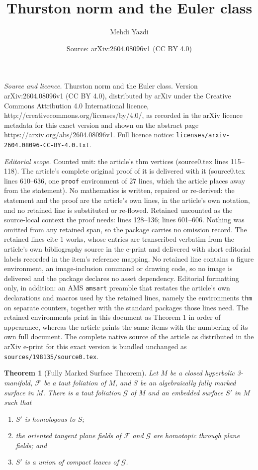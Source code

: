 \documentclass[10pt,a4paper]{amsart}
\title{Thurston norm and the Euler class}
\author{Mehdi Yazdi}
\date{Source: arXiv:2604.08096v1 (CC BY 4.0)}
\newtheorem{thm}{Theorem}
\begin{document}
\maketitle

\noindent\emph{Source and licence.} Thurston norm and the Euler class. Version arXiv:2604.08096v1 (CC BY 4.0), distributed by arXiv under the Creative Commons Attribution 4.0 International licence, http://creativecommons.org/licenses/by/4.0/, as recorded in the arXiv licence metadata for this exact version and shown on the abstract page https://arxiv.org/abs/2604.08096v1. Full licence notice: \texttt{licenses/arxiv-2604.08096-CC-BY-4.0.txt}.\par\smallskip

\noindent\textit{Editorial scope.} Counted unit: the article's thm vertices (source0.tex lines 115--118). The article's complete original proof of it is delivered with it (source0.tex lines 610--636, one \texttt{proof} environment of 27 lines, which the article places away from the statement). No mathematics is written, repaired or re-derived: the statement and the proof are the article's own lines, in the article's own notation, and no retained line is substituted or re-flowed.  Retained uncounted as the source-local context the proof needs: lines 128--136; lines 601--606.  Nothing was omitted from any retained span, so the package carries no omission record.  The retained lines cite 1 works, whose entries are transcribed verbatim from the article's own bibliography source in the e-print and delivered with short editorial labels recorded in the item's reference mapping.  No retained line contains a figure environment, an image-inclusion command or drawing code, so no image is delivered and the package declares no asset dependency.  Editorial formatting only, in addition: an AMS \texttt{amsart} preamble that restates the article's own declarations and macros used by the retained lines, namely the environments \texttt{thm} on separate counters, together with the standard packages those lines need.  The retained environments print in this document as Theorem 1 in order of appearance, whereas the article prints the same items with the numbering of its own full document.  The complete native source of the article as distributed in the arXiv e-print for this exact version is bundled unchanged as \texttt{sources/198135/source0.tex}.
	 \begin{thm}[Fully Marked Surface Theorem]
	 	Let $M$ be a closed hyperbolic 3-manifold, $\mathcal{F}$ be a taut foliation of $M$, and $S$ be an algebraically fully marked surface in $M$. There is a taut foliation $\mathcal{G}$ of $M$ and an embedded surface $S'$ in $M$ such that 
	 	\begin{enumerate}
	 		\item $S'$ is homologous to $S$; 
	 		\item the oriented tangent plane fields of $\mathcal{F}$ and $\mathcal{G}$ are homotopic through plane fields; and 
	 		\item $S'$ is a  union of compact leaves of $\mathcal{G}$.
	 	\end{enumerate} 
	 	\label{thm:fully marked surface}
	 \end{thm}
\end{document}
